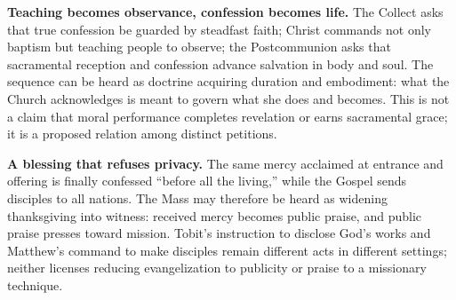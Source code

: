 \begin{deepstudy}
\noindent\textbf{Teaching becomes observance, confession becomes life.\enspace{}}
The Collect asks that true confession be guarded by steadfast faith; Christ commands not only baptism but teaching people to observe; the Postcommunion asks that sacramental reception and confession advance salvation in body and soul. The sequence can be heard as doctrine acquiring duration and embodiment: what the Church acknowledges is meant to govern what she does and becomes. This is not a claim that moral performance completes revelation or earns sacramental grace; it is a proposed relation among distinct petitions.

\noindent\textbf{A blessing that refuses privacy.\enspace{}}
The same mercy acclaimed at entrance and offering is finally confessed ``before all the living,'' while the Gospel sends disciples to all nations. The Mass may therefore be heard as widening thanksgiving into witness: received mercy becomes public praise, and public praise presses toward mission. Tobit's instruction to disclose God's works and Matthew's command to make disciples remain different acts in different settings; neither licenses reducing evangelization to publicity or praise to a missionary technique.

\newpage
\sectionguard

\end{deepstudy}
